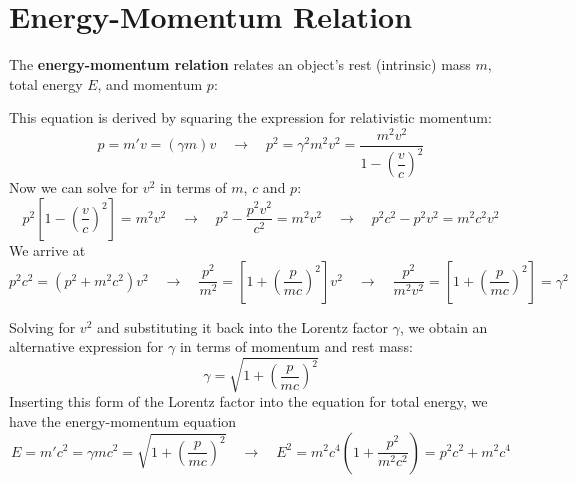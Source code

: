 \section{Energy-Momentum Relation}
The \textbf{energy-momentum relation} relates an object's rest (intrinsic)
mass $m$, total energy $E$, and momentum $p$:

This equation is derived by squaring the expression for relativistic momentum:
\begin{equation*}
  p=m'v=(\gamma m)v
  \quad\rightarrow\quad
  p^2=\gamma^2m^2v^2=\frac{m^2v^2}{1-\left(\dfrac vc\right)^2}
\end{equation*}
Now we can solve for $v^2$ in terms of $m$, $c$ and $p$:
\begin{equation*}
  p^2\left[1-\left(\dfrac vc\right)^2\right]=m^2v^2
  \quad\rightarrow\quad
  p^2-\frac{p^2v^2}{c^2}=m^2v^2
  \quad\rightarrow\quad
  p^2c^2-p^2v^2=m^2c^2v^2
\end{equation*}
We arrive at
\begin{equation*}
  p^2c^2=(p^2+m^2c^2)v^2
  \quad\rightarrow\quad
  \frac{p^2}{m^2}=\left[1+\left(\frac p{mc}\right)^2\right]v^2
  \quad\rightarrow\quad
  \frac{p^2}{m^2v^2}=\left[1+\left(\frac p{mc}\right)^2\right]=\gamma^2
\end{equation*}

Solving for $v^2$ and substituting it back into the Lorentz factor $\gamma$,
we obtain an alternative expression for $\gamma$ in terms of momentum and
rest mass:
\begin{equation*}
  \gamma =\sqrt{1+\left(\frac p{mc}\right)^2}
\end{equation*}
Inserting this form of the Lorentz factor into the equation for total energy,
we have the energy-momentum equation
\begin{equation}
  E=m'c^2=\gamma mc^2= \sqrt{1+\left(\frac p{mc}\right)^2}
  \quad\rightarrow\quad
  E^2=m^2c^4 \left(1+\frac{p^2}{m^2c^2}\right)
  =p^2c^2+m^2c^4
\end{equation}
%
%
%
%
%
  
